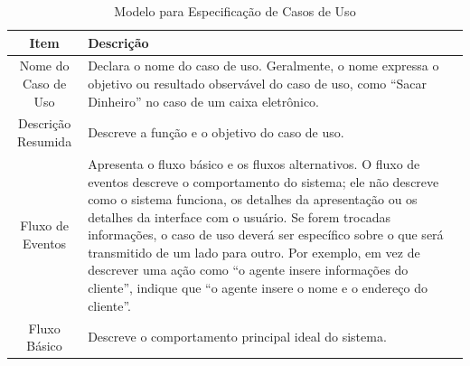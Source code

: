 \FloatBarrier
\begin{table}[!htbp]
  \centering
  \caption{Modelo para Especificação de Casos de Uso}
  \begin{tabular}{ c | p{11.5cm} }
    \hline
    \textbf{Item}        & \textbf{Descrição}                                                                                                                                                                                                                                                                                                                                                                                                                                                                                            \\ \hline
    Nome do Caso de Uso  &
    Declara o nome do caso de uso. Geralmente, o nome expressa o objetivo ou resultado observável do caso de uso, como ``Sacar Dinheiro'' no caso de um caixa eletrônico.                                                                                                                                                                                                                                                                                                                                                                \\ \hline
    Descrição Resumida   & Descreve a função e o objetivo do caso de uso.                                                                                                                                                                                                                                                                                                                                                                                                                                                                \\ \hline
    Fluxo de Eventos     & Apresenta o fluxo básico e os fluxos alternativos. O fluxo de eventos descreve o comportamento do sistema; ele não descreve como o sistema funciona, os detalhes da apresentação ou os detalhes da interface com o usuário. Se forem trocadas informações, o caso de uso deverá ser específico sobre o que será transmitido de um lado para outro. Por exemplo, em vez de descrever uma ação como ``o agente insere informações do cliente'', indique que ``o agente insere o nome e o endereço do cliente''. \\ \hline
    Fluxo Básico         & Descreve o comportamento principal ideal do sistema.                                                                                                                                                                                                                                                                                                                                                                                                                                                          \\ \hline

\end{tabular}
\end{table}
